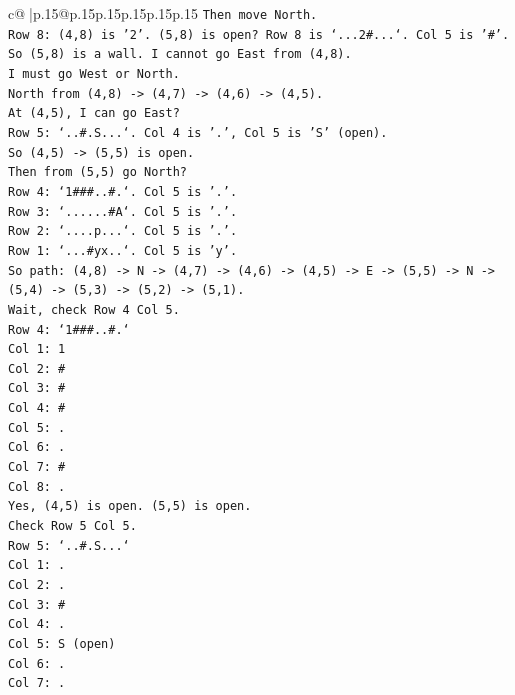 \documentclass{article}
\begin{document}
{\begin{supertabular}{c@{$\;$}|p{.15\linewidth}@{}p{.15\linewidth}p{.15\linewidth}p{.15\linewidth}p{.15\linewidth}p{.15\linewidth}}
{{{\texttt{Then move North.} \\
\texttt{Row 8: (4,8) is '2'. (5,8) is open? Row 8 is `...2\#...`. Col 5 is '\#'.} \\
\texttt{So (5,8) is a wall. I cannot go East from (4,8).} \\
\texttt{I must go West or North.} \\
\texttt{North from (4,8) {-}> (4,7) {-}> (4,6) {-}> (4,5).} \\
\texttt{At (4,5), I can go East?} \\
\texttt{Row 5: `..\#.S...`. Col 4 is '.', Col 5 is 'S' (open).} \\
\texttt{So (4,5) {-}> (5,5) is open.} \\
\texttt{Then from (5,5) go North?} \\
\texttt{Row 4: `1\#\#\#..\#.`. Col 5 is '.'.} \\
\texttt{Row 3: `......\#A`. Col 5 is '.'.} \\
\texttt{Row 2: `....p...`. Col 5 is '.'.} \\
\texttt{Row 1: `...\#yx..`. Col 5 is 'y'.} \\
\texttt{So path: (4,8) {-}> N {-}> (4,7) {-}> (4,6) {-}> (4,5) {-}> E {-}> (5,5) {-}> N {-}> (5,4) {-}> (5,3) {-}> (5,2) {-}> (5,1).} \\
\texttt{Wait, check Row 4 Col 5.} \\
\texttt{Row 4: `1\#\#\#..\#.`} \\
\texttt{Col 1: 1} \\
\texttt{Col 2: \#} \\
\texttt{Col 3: \#} \\
\texttt{Col 4: \#} \\
\texttt{Col 5: .} \\
\texttt{Col 6: .} \\
\texttt{Col 7: \#} \\
\texttt{Col 8: .} \\
\texttt{Yes, (4,5) is open. (5,5) is open.} \\
\texttt{Check Row 5 Col 5.} \\
\texttt{Row 5: `..\#.S...`} \\
\texttt{Col 1: .} \\
\texttt{Col 2: .} \\
\texttt{Col 3: \#} \\
\texttt{Col 4: .} \\
\texttt{Col 5: S (open)} \\
\texttt{Col 6: .} \\
\texttt{Col 7: .} \\
}}}
\end{supertabular}}
\end{document}
